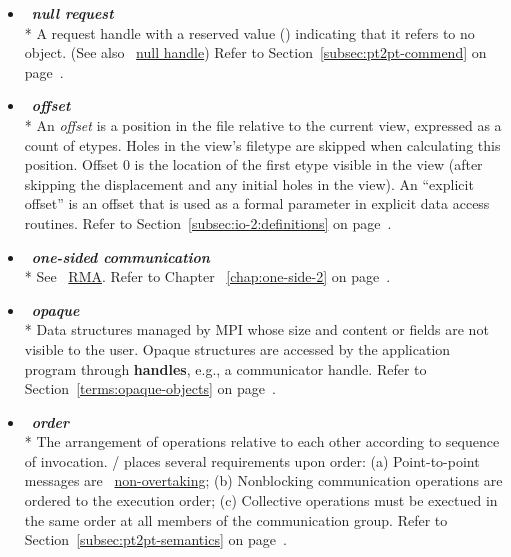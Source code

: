 \begin{itemize}
\label{glossary:null_request}
\item  ~\hypertarget{glossary:null_request}{\emph{\textbf{null request}}} \\*
A request handle with a reserved value () indicating that it refers to no object.
(See also ~\hyperlink{glossary:null_handle}{null handle})
Refer to Section~\ref{subsec:pt2pt-commend} on page~\pageref{subsec:pt2pt-commend}.

\label{glossary:offset}
\item  ~\hypertarget{glossary:offset}{\emph{\textbf{offset}}} \\*
An {\it offset} is a position
in the file
relative to the current view,
expressed as a count of etypes.
Holes in the view's filetype are skipped when calculating this position.
Offset 0 is the location of the first etype visible in the view
(after skipping the displacement and any initial holes in the view).
An ``explicit offset'' is an offset that is used as a formal parameter
in explicit data access routines.
Refer to Section~\ref{subsec:io-2:definitions} on page~\pageref{subsec:io-2:definitions}.

\label{glossary:one-sided_communication}
\item  ~\hypertarget{glossary:one-sided_communication}{\emph{\textbf{one-sided communication}}} \\*
See ~\hyperlink{glossary:RMA}{RMA}.
Refer to Chapter ~\ref{chap:one-side-2} on page~\pageref{chap:one-side-2}.


\label{glossary:opaque}
\item  ~\hypertarget{glossary:opaque}{\emph{\textbf{opaque}}} \\*
Data structures managed by MPI whose size and content or fields are not visible to the user. 
Opaque structures are accessed by the application program through {\bf handles}, e.g., a communicator handle. 
Refer to Section~\ref{terms:opaque-objects} on page~\pageref{terms:opaque-objects}.

\label{glossary:order}
\item  ~\hypertarget{glossary:order}{\emph{\textbf{order}}} \\*
The arrangement of operations relative to each other according to sequence of invocation.
\MPI/ places several requirements upon order: (a) Point-to-point messages are ~\hyperlink{glossary:non-overtaking}{non-overtaking};
(b) Nonblocking communication operations are ordered to the execution order;
(c) Collective operations must be exectued in the same order at all members of the communication group.
Refer to Section~\ref{subsec:pt2pt-semantics} on page~\pageref{subsec:pt2pt-semantics}.


\end{itemize}
